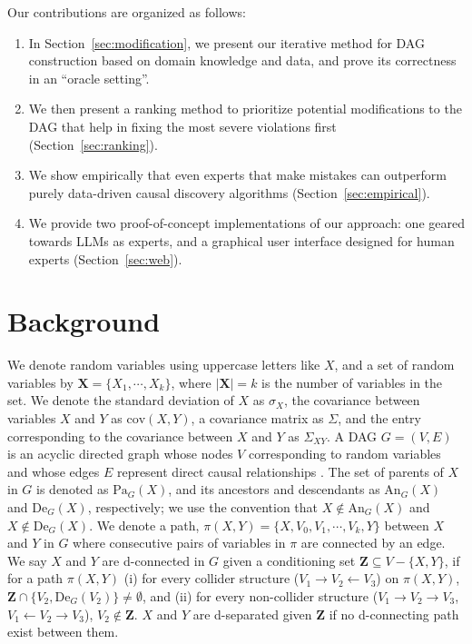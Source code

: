 \documentclass[accepted]{uai2025} %
\begin{document}
Our contributions are organized as follows:

\begin{enumerate}
    \item In Section~\ref{sec:modification}, we present our iterative method for DAG construction
	based on domain knowledge and data, and prove its correctness in an ``oracle setting''.
    \item We then present a ranking method to prioritize potential modifications to the DAG that 
    	    help in fixing the most severe violations first (Section~\ref{sec:ranking}).
    \item We show empirically that even experts that make mistakes can outperform purely 
	data-driven
	causal discovery algorithms (Section~\ref{sec:empirical}).
    \item We provide two proof-of-concept implementations of our approach: one geared towards
	LLMs as experts, and a graphical user interface designed 
	for human experts (Section~\ref{sec:web}).
\end{enumerate}

\section{Background}
\label{sec:background}
We denote random variables using uppercase letters like $X$, and a set of
random variables by $ \bm{X} = \{X_1, \cdots, X_k\} $, where $ \rvert \bm{X}
\rvert = k $ is the number of variables in the set. We denote the standard
deviation of $ X $ as $ \sigma_X $, the covariance between variables $ X $ and
$ Y $ as $ \mathrm{cov}(X, Y) $, a covariance matrix as $ \Sigma $, and the
entry corresponding to the covariance between $ X $ and $ Y $ as $ \Sigma_{XY}
$. A DAG $ G =
(V, E) $ is an acyclic directed graph whose nodes $ V $ corresponding to random
variables and whose edges $ E $ represent direct causal relationships
\citep{Pearl2009}.  The
set of parents of $ X $ in $ G $ is denoted as $ \textrm{Pa}_G(X) $, and its
ancestors and descendants as $ \textrm{An}_G(X) $ and $ \textrm{De}_G(X) $,
respectively; we use the convention that $X \notin \textrm{An}_G(X)$ and $X
\notin \textrm{De}_G(X)$. We denote a path, $ \pi(X, Y) = \{ X, V_0, V_1,
\cdots, V_k, Y \} $ between $ X $ and $ Y $ in $ G $ where consecutive pairs of
variables in $ \pi $ are connected by an edge. We say $ X $ and $ Y $ are
d-connected in $ G $ given a conditioning set $ \bm{Z} \subseteq V - \{X, Y\}
$, if for a path $ \pi(X, Y) $ (i) for every collider structure ($ V_1
\rightarrow V_2 \leftarrow V_3 $) on $ \pi(X, Y) $, $ \bm{Z} \cap \{ V_2,
\textrm{De}_G(V_2) \} \ne \emptyset $, and (ii) for every non-collider
structure ($ V_1 \rightarrow V_2 \rightarrow V_3 $, $ V_1 \leftarrow V_2
\rightarrow V_3 $), $ V_2 \not \in \bm{Z} $. $ X $ and $ Y $ are d-separated
given $ \bm{Z} $ if no d-connecting path exist between them.
\end{document}
